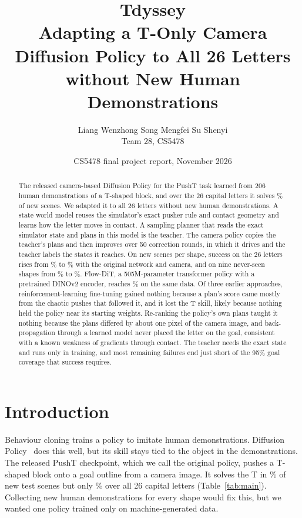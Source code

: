 \documentclass[10pt,twocolumn,letterpaper]{article}
\title{\textbf{Tdyssey}\\[1mm]\Large Adapting a T-Only Camera Diffusion Policy to All 26 Letters\\
  without New Human Demonstrations}
\author{Liang Wenzhong \quad Song Mengfei \quad Su Shenyi\\[1mm] Team 28, CS5478}
\date{CS5478 final project report, November 2026}
\begin{document}
\maketitle

\begin{abstract}
The released camera-based Diffusion Policy for the PushT task learned from 206 human demonstrations of a T-shaped
block, and over the 26 capital letters it solves \numHeadOrig\% of new scenes. We adapted it to all 26 letters without
new human demonstrations. A state world model reuses the simulator's exact pusher rule and contact geometry and learns
how the letter moves in contact. A sampling planner that reads the exact simulator state and plans in this model is
the teacher. The camera policy copies the teacher's plans and then improves over 50 correction rounds, in which it
drives and the teacher labels the states it reaches. On \numTestScenes{} new scenes per shape, success on the 26
letters rises from \numHeadOrig\% to \numHeadMain\% with the original network and camera, and on nine never-seen
shapes from \numUnseenOrig\% to \numUnseenMain\%. Flow-DiT, a 505M-parameter transformer policy with a pretrained
DINOv2 encoder, reaches \numHeadFlow\% on the same data. Of three earlier approaches, reinforcement-learning
fine-tuning gained nothing because a plan's score came mostly from the chaotic pushes that followed it, and it lost the
T skill, likely because nothing held the policy near its starting weights. Re-ranking the policy's own plans taught it
nothing because the plans differed by about one pixel of the camera image, and back-propagation through a learned model
never placed the letter on the goal, consistent with a known weakness of gradients through contact. The teacher needs
the exact state and runs only in training, and most remaining failures end just short of the 95\% goal coverage that
success requires.
\end{abstract}
\paperdatanote

\section{Introduction}
\label{sec:intro}

Behaviour cloning trains a policy to imitate human demonstrations. Diffusion Policy~\citep{chi2023diffusion} does this
well, but its skill stays tied to the object in the demonstrations. The released PushT checkpoint, which we call the
original policy, pushes a T-shaped block onto a goal outline from a camera image. It solves the T in \numTOrig\% of
new test scenes but only \numHeadOrig\% over all 26 capital letters (Table~\ref{tab:main}). Collecting new human
demonstrations for every shape would fix this, but we wanted one policy trained only on machine-generated data.
\end{document}
